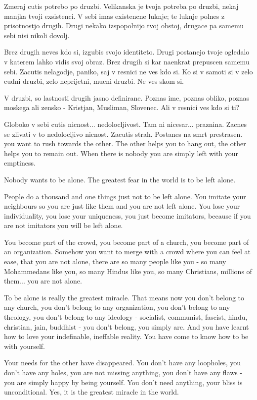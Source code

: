         

   Zmeraj cutis potrebo po druzbi. Velikanska je tvoja potreba po druzbi, nekaj manjka tvoji exsistenci. V sebi imas existencne luknje; te luknje polnes z prisotnostjo drugih. Drugi nekako izspopolnijo tvoj obstoj, drugace pa samemu sebi nisi nikoli dovolj. 

Brez drugih neves kdo si, izgubis svojo identiteto. Drugi postanejo tvoje ogledalo v katerem lahko vidis svoj obraz. Brez drugih si kar naenkrat prepuscen samemu sebi. Zacutis nelagodje, paniko, saj v resnici ne ves kdo si. Ko si v samoti si v zelo cudni druzbi, zelo neprijetni, mucni druzbi. Ne ves skom si. 

V druzbi, so lastnosti drugih jasno definirane. Poznas ime, poznas obliko, poznas moskega ali zensko - Kristjan, Musliman, Slovenec. Ali v resnici ves kdo si ti? 

Globoko v sebi cutis nicnost... nedolocljivost. Tam ni nicesar... praznina. Zacnes se zlivati v to nedolocljivo nicnost. Zacutis strah. Postanes na smrt prestrasen. you want to rush towards the other. The other helps you to hang out, the other helps you to remain out. When there is nobody you are simply left with your emptiness. 

Nobody wants to be alone. The greatest fear in the world is to be left alone. 

People do a thousand and one things just not to be left alone. You imitate your neighbours so you are just like them and you are not left alone. You lose your individuality, you lose your uniqueness, you just become imitators, because if you are not imitators you will be left alone. 

You become part of the crowd, you become part of a church, you become part of an organization. Somehow you want to merge with a crowd where you can feel at ease, that you are not alone, there are so many people like you - so many Mohammedans like you, so many Hindus like you, so many Christians, millions of them... you are not alone. 

To be alone is really the greatest miracle. That means now you don't belong to any church, you don't belong to any organization, you don't belong to any theology, you don't belong to any ideology - socialist, communist, fascist, hindu, christian, jain, buddhist - you don't belong, you simply are. And you have learnt how to love your indefinable, ineffable reality. You have come to know how to be with yourself. 

Your needs for the other have disappeared. You don't have any loopholes, you don't have any holes, you are not missing anything, you don't have any flaws - you are simply happy by being yourself. You don't need anything, your bliss is unconditional. Yes, it is the greatest miracle in the world. 

